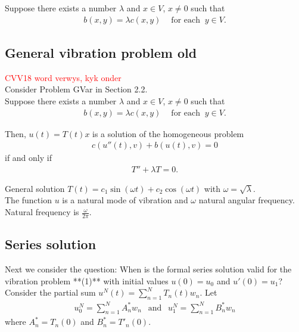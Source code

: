 \documentclass[../../main.tex]{subfiles}
\begin{document}
Suppose there exists a number $\lambda$ and $x \in V$, $x \neq 0$ such that
\begin{eqnarray*}
	b(x,y) = \lambda c(x,y) \ \ \ \ \textrm{ for each } \ y \in V.
\end{eqnarray*}




\subsection{General vibration problem old}

\textcolor{red}{CVV18 word verwys, kyk onder}\\

Consider Problem GVar in Section 2.2.\\

Suppose there exists a number $\lambda$ and $x \in V$, $x \neq 0$ such that
\begin{eqnarray*}
	b(x,y) = \lambda c(x,y) \ \ \ \ \textrm{ for each } \ y \in V.
\end{eqnarray*}

Then, $u(t) = T(t)x$ is a solution of the homogeneous problem
\begin{eqnarray*}
	c(u''(t),v) + b(u(t),v) = 0
\end{eqnarray*}
if and only if
\begin{eqnarray}
	T''  + \lambda T = 0.
\end{eqnarray}

General solution $T(t) = c_1 \sin(\omega t) + c_2 \cos(\omega t)$ with $\omega = \sqrt{\lambda}$.\\

The function $u$ is a natural mode of vibration and $\omega$ natural angular frequency. Natural frequency is $\frac{\omega}{2 \pi}$.

\subsection*{Series solution}\label{ssec:existence:SeriesSolution}
Next we consider the question: When is the formal series solution valid for the vibration problem **(1)** with initial values $u(0) = u_0$ and $u'(0) = u_1$?\\

Consider the partial sum $u^{N}(t) = \sum_{n=1}^{N} T_{n}(t)w_n$. Let
\begin{eqnarray*}
	u_0^{N} = \sum_{n=1}^{N} A^*_n w_n \ \ \textrm{ and } \ \ u_{1}^{N} =\sum_{n=1}^{N} B^*_n w_n
\end{eqnarray*} where $A^*_n = T_n(0)$ and $B^*_n = T'_n(0)$.\\
\end{document}
